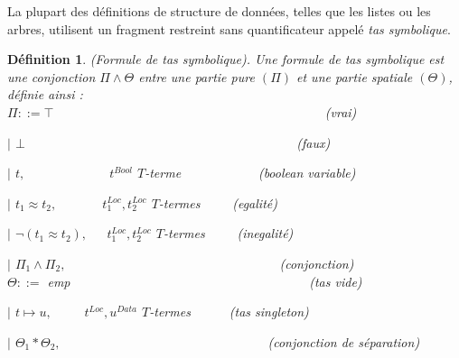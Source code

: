 \documentclass[11pt,openany]{article}
\newtheorem{definition}{D\'efinition}[subsection]
\begin{document}
	La plupart des d\'efinitions de structure de donn\'ees, telles que les listes ou les arbres, utilisent un fragment restreint sans quantificateur appel\'e \textit{tas symbolique}.
\begin{definition}
(Formule de tas symbolique). Une formule de \textit{tas symbolique} est une conjonction $\Pi\land\Theta$ entre une partie pure $(\Pi)$ et une partie spatiale $(\Theta)$, d\'efinie ainsi :\\
$\Pi ::= \top$~~~~~~~~~~~~~~~~~~~~~~~~~~~~~~~~~~~~~~~~~~(vrai)\par
$|$ $\bot$~~~~~~~~~~~~~~~~~~~~~~~~~~~~~~~~~~~~~~~~~~(faux)\par
$|$ $t,$~~~~~~~~~~~~~$t^{Bool}$ $T$-terme~~~~~~~~~~~~(boolean variable)\par
$|$ $t_{1}\approx t_{2},$~~~~~~~$t^{Loc}_{1},t^{Loc}_{2}$ $T$-termes~~~~~(egalit\'e)\par
$|$ $\neg(t_{1}\approx t_{2}),$~~~$t^{Loc}_{1},t^{Loc}_{2}$ $T$-termes~~~~~(inegalit\'e)\par
$|$ $\Pi_{1}\land\Pi_{2},$~~~~~~~~~~~~~~~~~~~~~~~~~~~~~~~~~(conjonction)\\
$\Theta ::=$ emp~~~~~~~~~~~~~~~~~~~~~~~~~~~~~~~~~~~~~(tas vide)\par
$|$ $t\mapsto u,$~~~~~$t^{Loc},u^{Data}$ $T$-termes~~~~~~(tas singleton)\par
$|$ $\Theta_{1}*\Theta_{2},$~~~~~~~~~~~~~~~~~~~~~~~~~~~~~~~~(conjonction de s\'eparation)
\end{definition}
\end{document}
